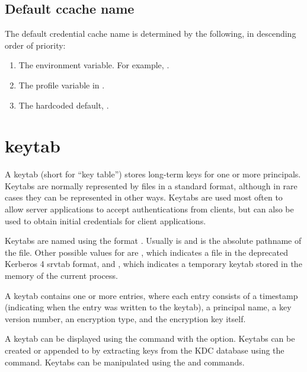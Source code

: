 \documentclass[letterpaper,10pt,english]{sphinxmanual}
\begin{document}
\section{Default ccache name}
\label{\detokenize{basic/ccache_def:default-ccache-name}}
The default credential cache name is determined by the following, in
descending order of priority:
\begin{enumerate}
\item {} 
The  environment variable.  For example,
.

\item {} 
The  profile variable in .

\item {} 
The hardcoded default, .

\end{enumerate}


\chapter{keytab}
\label{\detokenize{basic/keytab_def:keytab}}\label{\detokenize{basic/keytab_def::doc}}\label{\detokenize{basic/keytab_def:keytab-definition}}
A keytab (short for “key table”) stores long-term keys for one or more
principals.  Keytabs are normally represented by files in a standard
format, although in rare cases they can be represented in other ways.
Keytabs are used most often to allow server applications to accept
authentications from clients, but can also be used to obtain initial
credentials for client applications.

Keytabs are named using the format \sphinxcode{:}.  Usually
 is  and  is the absolute pathname of the file.
Other possible values for  are , which indicates a
file in the deprecated Kerberos 4 srvtab format, and , which
indicates a temporary keytab stored in the memory of the current
process.

A keytab contains one or more entries, where each entry consists of a
timestamp (indicating when the entry was written to the keytab), a
principal name, a key version number, an encryption type, and the
encryption key itself.

A keytab can be displayed using the  command with the
 option.  Keytabs can be created or appended to by extracting
keys from the KDC database using the  
command.  Keytabs can be manipulated using the  and
 commands.
\end{document}
